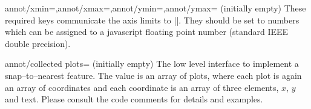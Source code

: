 \begin{pgfplotskeylist}{annot/xmin=,annot/xmax=,annot/ymin=,annot/ymax= (initially empty)}
	These required keys communicate the axis limits to |\pgfplotsclickablecreate|. They should be set to numbers which can be assigned to a javascript floating point number (standard IEEE double precision).
\end{pgfplotskeylist}

\begin{pgfplotskey}{annot/collected plots= (initially empty)}
	The low level interface to implement a snap--to--nearest feature. The value is an array of plots, where each plot is again an array of coordinates and each coordinate is an array of three elements, $x$, $y$ and text. Please consult the code comments for details and examples.
\end{pgfplotskey}
